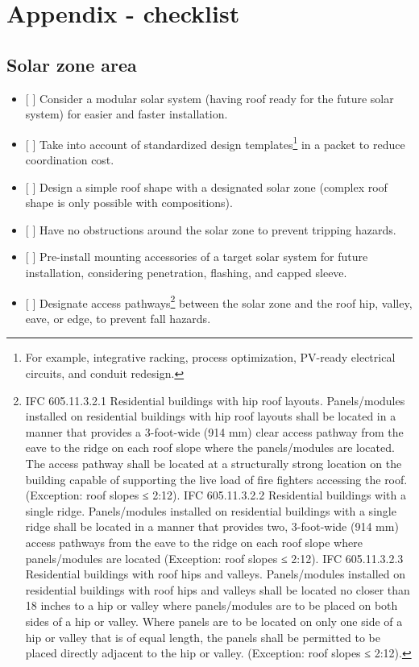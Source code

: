 \documentclass[]{article}
\providecommand{\tightlist}{%
  \setlength{\itemsep}{0pt}\setlength{\parskip}{0pt}}
\let\rmarkdownfootnote\footnote%
\def\footnote{\protect\rmarkdownfootnote}
\begin{document}
\hypertarget{appendix---checklist}{%
\section{Appendix - checklist}\label{appendix---checklist}}

\hypertarget{solar-zone-area-1}{%
\subsection{Solar zone area}\label{solar-zone-area-1}}

\begin{itemize}
\tightlist
\item
  {[} {]} Consider a modular solar system (having roof ready for the
  future solar system) for easier and faster installation.
\item
  {[} {]} Take into account of standardized design templates\footnote{For
    example, integrative racking, process optimization, PV-ready
    electrical circuits, and conduit redesign.} in a packet to reduce
  coordination cost.
\item
  {[} {]} Design a simple roof shape with a designated solar zone
  (complex roof shape is only possible with compositions).
\item
  {[} {]} Have no obstructions around the solar zone to prevent tripping
  hazards.
\item
  {[} {]} Pre-install mounting accessories of a target solar system for
  future installation, considering penetration, flashing, and capped
  sleeve.
\item
  {[} {]} Designate access pathways\footnote{IFC 605.11.3.2.1
    Residential buildings with hip roof layouts. Panels/modules
    installed on residential buildings with hip roof layouts shall be
    located in a manner that provides a 3-foot-wide (914 mm) clear
    access pathway from the eave to the ridge on each roof slope where
    the panels/modules are located. The access pathway shall be located
    at a structurally strong location on the building capable of
    supporting the live load of fire fighters accessing the roof.
    (Exception: roof slopes ≤ 2:12). IFC 605.11.3.2.2 Residential
    buildings with a single ridge. Panels/modules installed on
    residential buildings with a single ridge shall be located in a
    manner that provides two, 3-foot-wide (914 mm) access pathways from
    the eave to the ridge on each roof slope where panels/modules are
    located (Exception: roof slopes ≤ 2:12). IFC 605.11.3.2.3
    Residential buildings with roof hips and valleys. Panels/modules
    installed on residential buildings with roof hips and valleys shall
    be located no closer than 18 inches to a hip or valley where
    panels/modules are to be placed on both sides of a hip or valley.
    Where panels are to be located on only one side of a hip or valley
    that is of equal length, the panels shall be permitted to be placed
    directly adjacent to the hip or valley. (Exception: roof slopes ≤
    2:12).} between the solar zone and the roof hip, valley, eave, or
  edge, to prevent fall hazards.
\end{itemize}
\end{document}

